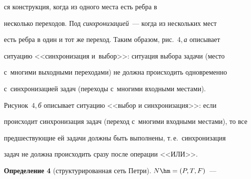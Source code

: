 


\noindent

ся конструкция, когда из одного мес\-та есть ребра в 

несколько переходов. Под \textit{синхронизацией}~--- когда из нескольких мест 

есть ребра в один и тот же переход. Таким образом, рис.~4,\,\textit{а} описывает 

ситуацию <<синхронизация и~выбор>>: ситуация выбора задачи (мес\-то 

с~многими выходными переходами) не должна происходить одновременно 

с~синхронизацией задач (переходы с~мно\-ги\-ми входными местами). 

Рисунок~4,\,\textit{б} описывает ситуацию <<выбор и синхронизация>>: если 

происходит синхронизация задач (переход с~мно\-ги\-ми входными местами), то все 

пред\-шест\-ву\-ющие ей задачи должны быть выполнены, т.\,е.\ синхронизация 

задач не должна происходить сразу после операции <<ИЛИ>>.





  

  \smallskip

  

  \noindent

  \textbf{Определение 4} (структурированная сеть Петри). $N\hm=(P,T,F)$~---  

